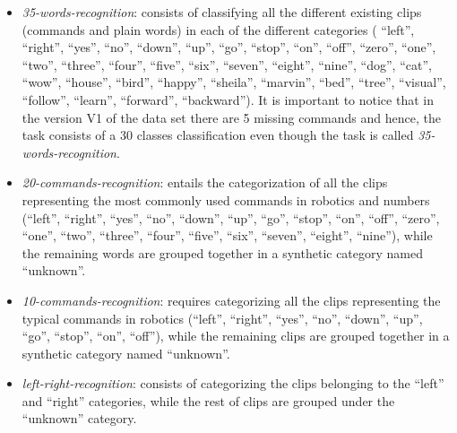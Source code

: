 \documentclass[review]{elsarticle}
\begin{document}
\begin{itemize}
	\item \textit{35-words-recognition}: consists of classifying all the different existing clips (commands and plain words) in each of the different categories (
	``left'', 
	``right'', 
	``yes'', 
	``no'', 
	``down'', 
	``up'', 
	``go'', 
	``stop'', 
	``on'', 
	``off'', 
	``zero'', 
	``one'', 
	``two'', 
	``three'', 
	``four'', 
	``five'', 
	``six'', 
	``seven'', 
	``eight'', 
	``nine'', 
	``dog'', 
	``cat'', 
	``wow'', 
	``house'', 
	``bird'', 
	``happy'', 
	``sheila'', 
	``marvin'',
	``bed'', 
	``tree'',  
	``visual'', 
	``follow'', 
	``learn'', 
	``forward'',
	``backward''). It is important to notice that in the version V1 of the data set there are 5 missing commands and hence, the task consists of a 30 classes classification even though the task is called \textit{35-words-recognition}.
	\item \textit{20-commands-recognition}: entails the categorization of all the clips representing the most commonly used commands in robotics \cite{Warden2018} and numbers (``left'', 
	``right'', 
	``yes'', 
	``no'', 
	``down'', 
	``up'', 
	``go'', 
	``stop'', 
	``on'', 
	``off'', 
	``zero'', 
	``one'', 
	``two'', 
	``three'', 
	``four'', 
	``five'', 
	``six'', 
	``seven'', 
	``eight'', 
	``nine''), while the remaining words are grouped together in a synthetic category named ``unknown''.
	\item \textit{10-commands-recognition}: requires categorizing all the clips representing the typical commands in robotics (``left'', 
	``right'', 
	``yes'', 
	``no'', 
	``down'', 
	``up'', 
	``go'', 
	``stop'', 
	``on'', 
	``off''), while the remaining clips are grouped together in a synthetic category named ``unknown''.
	\item \textit{left-right-recognition}: consists of categorizing the clips belonging to the ``left'' and ``right'' categories, while the rest of clips are grouped under the ``unknown'' category.
\end{itemize}
\end{document}
